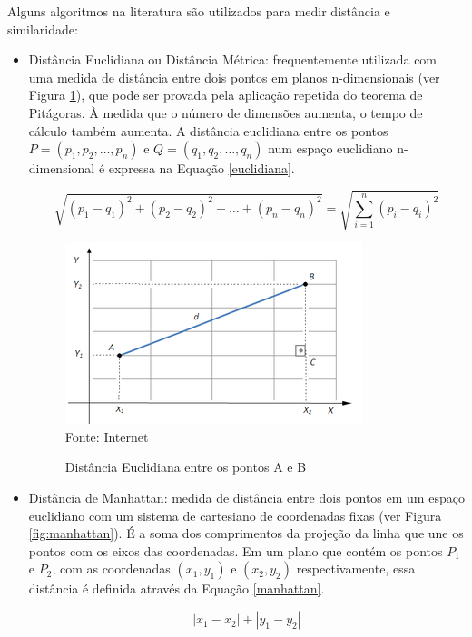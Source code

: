 Alguns algoritmos na literatura são utilizados para medir distância e similaridade:

\begin{itemize}
    \item Distância Euclidiana ou Distância Métrica: frequentemente utilizada com uma medida de distância entre dois pontos em planos n-dimensionais (ver Figura \ref{fig:euclidiana}), que pode ser provada pela aplicação repetida do teorema de Pitágoras. À medida que o número de dimensões aumenta, o tempo de cálculo também aumenta. A distância euclidiana entre os pontos \({P=(p_{1},p_{2},\ldots,p_{n})}\) e \({Q=(q_{1},q_{2},\ldots, q_{n})}\) num espaço euclidiano n-dimensional é expressa na Equação \ref{euclidiana}.
    
    \begin{equation} \label{euclidiana}
        \sqrt {(p_{1}-q_{1})^{2}+(p_{2}-q_{2})^{2}+\ldots +(p_{n}-q_{n})^{2}}=\sqrt {\sum _{i=1}^{n}(p_{i}-q_{i})^{2}}
    \end{equation}
    
    \begin{figure}[!htb]
       \centering
       \caption{Distância Euclidiana entre os pontos A e B}\label{fig:euclidiana} 
       \includegraphics[scale=0.85]{figuras/euclidiana.png}
       \\Fonte: Internet
    \end{figure}
    
    \item Distância de Manhattan: medida de distância entre dois pontos em um espaço euclidiano com um sistema de cartesiano de coordenadas fixas (ver Figura \ref{fig:manhattan}). É a soma dos comprimentos da projeção da linha que une os pontos com os eixos das coordenadas. Em um plano que contém os pontos \({P_{1}}\) e \({P_{2}}\), com as coordenadas \({(x_{1},y_{1})}\) e \({(x_{2},y_{2})}\) respectivamente, essa distância é definida através da Equação \ref{manhattan}.
    
    \begin{equation} \label{manhattan}
        \left|x_{1}-x_{2}\right|+\left|y_{1}-y_{2}\right|
    \end{equation}
    

\end{itemize}
